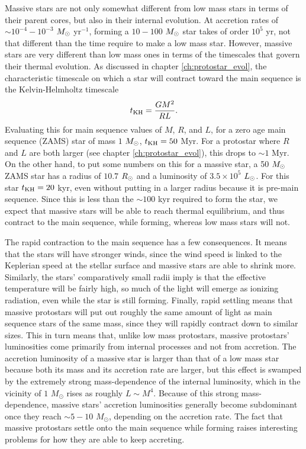 Massive stars are not only somewhat different from low mass stars in terms of their parent cores, but also in their internal evolution. At accretion rates of $\sim 10^{-4}-10^{-3}$ $M_{\odot}$ yr$^{-1}$, forming a $10-100$ $M_{\odot}$ star takes of order $10^5$ yr, not that different than the time require to make a low mass star. However, massive stars are very different than low mass ones in terms of the timescales that govern their thermal evolution. As discussed in chapter \ref{ch:protostar_evol}, the characteristic timescale on which a star will contract toward the main sequence is the Kelvin-Helmholtz timescale
\begin{equation}
t_{\rm KH} = \frac{GM^2}{RL}.
\end{equation}
Evaluating this for main sequence values of $M$, $R$, and $L$, for a zero age main sequence (ZAMS) star of mass $1$ $M_{\odot}$, $t_{\rm KH} = 50$ Myr.  For a protostar where $R$ and $L$ are both larger (see chapter \ref{ch:protostar_evol}), this drops to $\sim 1$ Myr. On the other hand, to put some numbers on this for a massive star, a 50 $M_{\odot}$ ZAMS star has a radius of $10.7$ $R_{\odot}$ and a luminosity of $3.5\times 10^5$ $L_{\odot}$. For this star $t_{\rm KH}=20$ kyr, even without putting in a larger radius because it is pre-main sequence. Since this is less than the $\sim 100$ kyr required to form the star, we expect that massive stars will be able to reach thermal equilibrium, and thus contract to the main sequence, while forming, whereas low mass stars will not.

The rapid contraction to the main sequence has a few consequences. It means that the stars will have stronger winds, since the wind speed is linked to the Keplerian speed at the stellar surface and massive stars are able to shrink more. Similarly, the stars' comparatively small radii imply is that the effective temperature will be fairly high, so much of the light will emerge as ionizing radiation, even while the star is still forming. Finally, rapid settling means that massive protostars will put out roughly the same amount of light as main sequence stars of the same mass, since they will rapidly contract down to similar sizes. This in turn means that, unlike low mass protostars, massive protostars' luminosities come primarily from internal processes and not from accretion. The accretion luminosity of a massive star is larger than that of a low mass star because both its mass and its accretion rate are larger, but this effect is swamped by the extremely strong mass-dependence of the internal luminosity, which in the vicinity of $1$ $M_\odot$ rises as roughly $L \sim M^4$. Because of this strong mass-dependence, massive stars' accretion luminosities generally become subdominant once they reach $\sim 5-10$ $M_\odot$, depending on the accretion rate. The fact that massive protostars settle onto the main sequence while forming raises interesting problems for how they are able to keep accreting.

